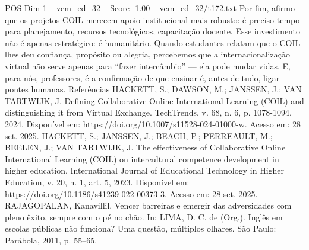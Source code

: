\begin{textsample}{POS Dim 1 – vem\_ed\_32 – Score -1.00 – vem\_ed\_32/t172.txt}
Por fim, afirmo que os projetos COIL merecem apoio institucional mais robusto: é preciso tempo para planejamento, recursos tecnológicos, capacitação docente.
Esse investimento não é apenas estratégico: é humanitário.
Quando estudantes relatam que o COIL lhes deu confiança, propósito ou alegria, percebemos que a internacionalização virtual não serve apenas para “fazer intercâmbio” — ela pode mudar vidas.
E, para nós, professores, é a confirmação de que ensinar é, antes de tudo, ligar pontes humanas.
Referências HACKETT, S.; DAWSON, M.; JANSSEN, J.; VAN TARTWIJK, J.
Defining Collaborative Online International Learning (COIL) and distinguishing it from Virtual Exchange.
TechTrends, v. 68, n. 6, p. 1078-1094, 2024.
Disponível em: https://doi.org/10.1007/s11528-024-01000-w.
Acesso em: 28 set. 2025.
HACKETT, S.; JANSSEN, J.; BEACH, P.; PERREAULT, M.; BEELEN, J.; VAN TARTWIJK, J.
The effectiveness of Collaborative Online International Learning (COIL) on intercultural competence development in higher education.
International Journal of Educational Technology in Higher Education, v. 20, n. 1, art. 5, 2023.
Disponível em: https://doi.org/10.1186/s41239-022-00373-3.
Acesso em: 28 set. 2025.
RAJAGOPALAN, Kanavillil.
Vencer barreiras e emergir das adversidades com pleno êxito, sempre com o pé no chão.
In: LIMA, D.
C. de (Org.).
Inglês em escolas públicas não funciona?
Uma questão, múltiplos olhares.
São Paulo: Parábola, 2011, p. 55–65.

\end{textsample}
